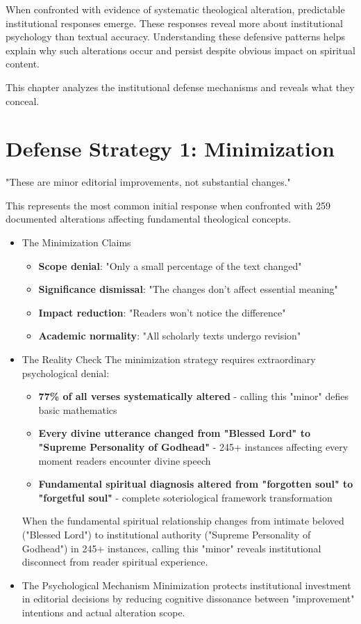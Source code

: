 \documentclass[11pt,twoside]{book}
\begin{document}
\normalfont\justifying
When confronted with evidence of systematic theological alteration, predictable institutional responses emerge. These responses reveal more about institutional psychology than textual accuracy. Understanding these defensive patterns helps explain why such alterations occur and persist despite obvious impact on spiritual content.

This chapter analyzes the institutional defense mechanisms and reveals what they conceal.
\section*{Defense Strategy 1: Minimization}
\label{sec:orgba2c7ef}

"These are minor editorial improvements, not substantial changes."

This represents the most common initial response when confronted with 259 documented alterations affecting fundamental theological concepts.
\begin{itemize}
\item The Minimization Claims
\label{sec:org08a8662}
\begin{itemize}
\item \textbf{\textbf{Scope denial}}: "Only a small percentage of the text changed"
\item \textbf{\textbf{Significance dismissal}}: "The changes don't affect essential meaning"
\item \textbf{\textbf{Impact reduction}}: "Readers won't notice the difference"
\item \textbf{\textbf{Academic normality}}: "All scholarly texts undergo revision"
\end{itemize}
\item The Reality Check
\label{sec:orgaab945c}
The minimization strategy requires extraordinary psychological denial:
\begin{itemize}
\item \textbf{\textbf{77\% of all verses systematically altered}} - calling this "minor" defies basic mathematics
\item \textbf{\textbf{Every divine utterance changed from "Blessed Lord" to "Supreme Personality of Godhead"}} - 245+ instances affecting every moment readers encounter divine speech
\item \textbf{\textbf{Fundamental spiritual diagnosis altered from "forgotten soul" to "forgetful soul"}} - complete soteriological framework transformation
\end{itemize}

When the fundamental spiritual relationship changes from intimate beloved ("Blessed Lord") to institutional authority ("Supreme Personality of Godhead") in 245+ instances, calling this "minor" reveals institutional disconnect from reader spiritual experience.
\item The Psychological Mechanism
\label{sec:orgf7d109f}
Minimization protects institutional investment in editorial decisions by reducing cognitive dissonance between "improvement" intentions and actual alteration scope.
\end{itemize}
\end{document}
